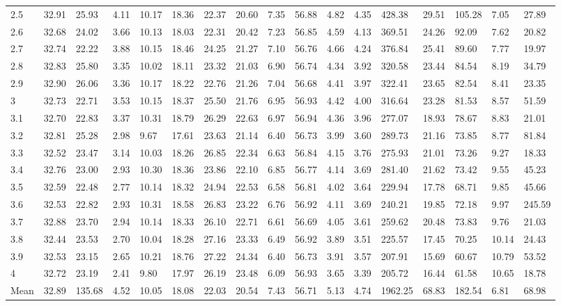 \begin{adjustbox}{angle=90}
\begin{center}
\begin{tabular}{|l|llllllllllllllll|}
2.5&32.91&25.93&4.11&10.17&18.36&22.37&20.60&7.35&56.88&4.82&4.35&428.38&29.51&105.28&7.05&27.89  \\ 
2.6&32.68&24.02&3.66&10.13&18.03&22.31&20.42&7.23&56.85&4.59&4.13&369.51&24.26&92.09&7.62&20.82  \\ 
2.7&32.74&22.22&3.88&10.15&18.46&24.25&21.27&7.10&56.76&4.66&4.24&376.84&25.41&89.60&7.77&19.97  \\ 
2.8&32.83&25.80&3.35&10.02&18.11&23.32&21.03&6.90&56.74&4.34&3.92&320.58&23.44&84.54&8.19&34.79  \\ 
2.9&32.90&26.06&3.36&10.17&18.22&22.76&21.26&7.04&56.68&4.41&3.97&322.41&23.65&82.54&8.41&23.35  \\ 
3&32.73&22.71&3.53&10.15&18.37&25.50&21.76&6.95&56.93&4.42&4.00&316.64&23.28&81.53&8.57&51.59  \\ 
3.1&32.70&22.83&3.37&10.31&18.79&26.29&22.63&6.97&56.94&4.36&3.96&277.07&18.93&78.67&8.83&21.01  \\ 
3.2&32.81&25.28&2.98&9.67&17.61&23.63&21.14&6.40&56.73&3.99&3.60&289.73&21.16&73.85&8.77&81.84  \\ 
3.3&32.52&23.47&3.14&10.03&18.26&26.85&22.34&6.63&56.84&4.15&3.76&275.93&21.01&73.26&9.27&18.33  \\ 
3.4&32.76&23.00&2.93&10.30&18.36&23.86&22.10&6.85&56.77&4.14&3.69&281.40&21.62&73.42&9.55&45.23  \\ 
3.5&32.59&22.48&2.77&10.14&18.32&24.94&22.53&6.58&56.81&4.02&3.64&229.94&17.78&68.71&9.85&45.66  \\ 
3.6&32.53&22.82&2.93&10.31&18.58&26.83&23.22&6.76&56.92&4.11&3.69&240.21&19.85&72.18&9.97&245.59  \\ 
3.7&32.88&23.70&2.94&10.14&18.33&26.10&22.71&6.61&56.69&4.05&3.61&259.62&20.48&73.83&9.76&21.03  \\ 
3.8&32.44&23.53&2.70&10.04&18.28&27.16&23.33&6.49&56.92&3.89&3.51&225.57&17.45&70.25&10.14&24.43  \\ 
3.9&32.53&23.15&2.65&10.21&18.76&27.22&24.34&6.40&56.73&3.91&3.57&207.91&15.69&60.67&10.79&53.52  \\ 
4&32.72&23.19&2.41&9.80&17.97&26.19&23.48&6.09&56.93&3.65&3.39&205.72&16.44&61.58&10.65&18.78  \\ \hline \hline
Mean&32.89&135.68&4.52&10.05&18.08&22.03&20.54&7.43&56.71&5.13&4.74&1962.25&68.83&182.54&6.81&68.98  \\ \hline
\end{tabular}
\end{center}
\end{adjustbox}





